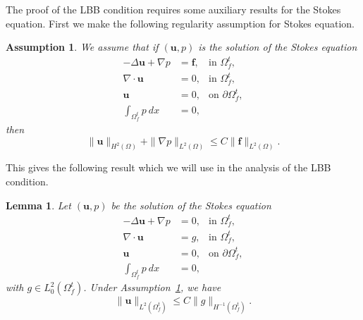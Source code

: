 \documentclass{article}
\newcommand{\bu}{{\mathbf{u}}}
\newtheorem{lemma}[theorem]{Lemma}
\newtheorem{assumption}[theorem]{Assumption}
\begin{document}
The proof of the LBB condition requires some auxiliary results for the Stokes equation.
First we make the following regularity assumption for Stokes equation.
\begin{assumption}\label{assumption:regularity}
    We assume that if $(\bu,p)$ is the solution of the Stokes equation
    \begin{equation}\label{eq:stokes_aux1}
        \begin{aligned}
        -\Delta \bu+ \nabla p &= \mathbf{f},&\text{in }\Omega_f^t,\\
        \nabla \cdot \bu &= 0, &\text{in }\Omega_f^t,\\
        \bu &= 0, &\text{on }\partial\Omega_f^t,\\
        \int_{\Omega_f^t} p \ dx &= 0,
    \end{aligned}
    \end{equation}
    then 
    \begin{equation}
        \|\bu\|_{H^2(\Omega)} + \|\nabla p\|_{L^2(\Omega)}\leqslant C \|\mathbf{f}\|_{L^2(\Omega)}.
    \end{equation}
\end{assumption}
This gives the following result which we will use in the analysis of the LBB condition.
\begin{lemma}\label{lemma:stokes_estimate}
    Let $(\bu,p)$ be the solution of the Stokes equation
    \begin{equation}\label{eq:stokes_aux2}
    \begin{aligned}
        -\Delta \bu+ \nabla p &= 0,&\text{in }\Omega_f^t,\\
        \nabla \cdot \bu &= g, &\text{in }\Omega_f^t,\\
        \bu &= 0, &\text{on }\partial\Omega_f^t,\\
        \int_{\Omega_f^t} p \ dx &= 0,
    \end{aligned}
    \end{equation}
    with $g \in L_0^2(\Omega_f^t)$. Under Assumption~\ref{assumption:regularity}, we have 
    \begin{equation}
        \|\bu\|_{L^2(\Omega_f^t)} \leq C \|g\|_{H^{-1}(\Omega_f^t)}.
    \end{equation}
\end{lemma}
\end{document}
